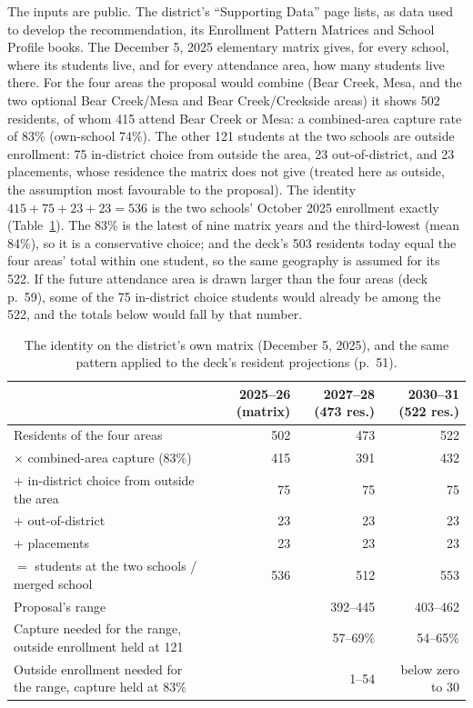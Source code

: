\documentclass[11pt]{article}
\begin{document}
The inputs are public. The district's ``Supporting Data'' page lists, as data used to develop the recommendation, its Enrollment Pattern Matrices and School Profile books. The December 5, 2025 elementary matrix gives, for every school, where its students live, and for every attendance area, how many students live there. For the four areas the proposal would combine (Bear Creek, Mesa, and the two optional Bear Creek/Mesa and Bear Creek/Creekside areas) it shows 502 residents, of whom 415 attend Bear Creek or Mesa: a combined-area capture rate of 83\% (own-school 74\%). The other 121 students at the two schools are outside enrollment: 75 in-district choice from outside the area, 23 out-of-district, and 23 placements, whose residence the matrix does not give (treated here as outside, the assumption most favourable to the proposal). The identity $415 + 75 + 23 + 23 = 536$ is the two schools' October 2025 enrollment exactly (Table~\ref{tab:identity}). The 83\% is the latest of nine matrix years and the third-lowest (mean 84\%), so it is a conservative choice; and the deck's 503 residents today equal the four areas' total within one student, so the same geography is assumed for its 522. If the future attendance area is drawn larger than the four areas (deck p.\ 59), some of the 75 in-district choice students would already be among the 522, and the totals below would fall by that number.

\begin{table}[htbp]\centering\footnotesize
\caption{The identity on the district's own matrix (December 5, 2025), and the same pattern applied to the deck's resident projections (p.\ 51).}\label{tab:identity}
\begin{tabular}{p{7.2cm}rrr}
\toprule
 & 2025--26 (matrix) & 2027--28 (473 res.) & 2030--31 (522 res.) \\
\midrule
Residents of the four areas & 502 & 473 & 522 \\
$\times$ combined-area capture (83\%) & 415 & 391 & 432 \\
$+$ in-district choice from outside the area & 75 & 75 & 75 \\
$+$ out-of-district & 23 & 23 & 23 \\
$+$ placements & 23 & 23 & 23 \\
$=$ students at the two schools / merged school & 536 & 512 & 553 \\
\midrule
Proposal's range & & 392--445 & 403--462 \\
Capture needed for the range, outside enrollment held at 121 & & 57--69\% & 54--65\% \\
Outside enrollment needed for the range, capture held at 83\% & & 1--54 & below zero to 30 \\
\bottomrule
\end{tabular}
\end{table}
\end{document}
